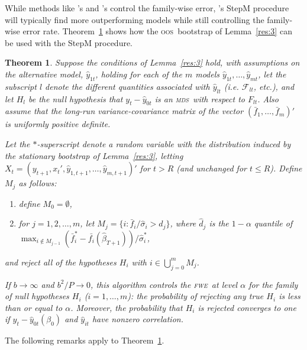\documentclass[12pt]{article}
\newcommand\citepos[2][]{\citeauthor{#2}'s \citeyearpar[#1]{#2}}
\newtheorem{thm}{Theorem}
\theoremstyle{definition}
\newcommand{\mds}{\textsc{mds}}
\newcommand{\oos}{\textsc{oos}}
\newcommand{\fwe}{\textsc{fwe}}
\begin{document}
While methods like \citepos{Whi:00} and \citepos{Han:05} control the
family-wise error, \citepos{RoW:05} StepM procedure will typically find
more outperforming models while still controlling the family-wise error
rate.  Theorem~\ref{res:2} shows how the \oos\ bootstrap of
Lemma~\ref{res:3} can be used with the StepM procedure.  

\begin{thm}\label{res:2}
  Suppose the conditions of Lemma~\ref{res:3} hold, with assumptions
  on the alternative model, $\hat{y}_{1t}$, holding for each of the
  $m$ models $\hat{y}_{1t}, \dots, \hat{y}_{mt}$, let the subscript
  $l$ denote the different quantities associated with $\hat{y}_{lt}$
  (i.e. $\mathcal{F}_{lt}$, etc.), and let $H_l$ be the null
  hypothesis that $y_t - \hat{y}_{0t}$ is an \mds\ with respect to
  $F_{lt}$.  Also assume that the long-run variance-covariance matrix
  of the vector $(\bar{f}_1,\dots,\bar{f}_m)'$ is uniformly positive
  definite.  

  Let the $*$-superscript denote a random variable with the
  distribution induced by the stationary bootstrap of
  Lemma~\ref{res:3}, letting $X_t = (y_{t+1}, x_t', \hat{y}_{1,t+1},
  \dots, \hat{y}_{m, t+1})'$ for $t > R$ (and unchanged for $t \leq
  R$).  Define $M_j$ as follows:
  \begin{enumerate}
  \item define $M_0 = \emptyset$,
  \item for $j = 1,2,\dots,m$, let $M_j = \{i : \bar{f}_{i} /
    \hat{\sigma}_i > \hat{d}_j\}$, where $\hat{d}_j$ is the $1-\alpha$
    quantile of $\max_{i \notin M_{j-1}} (\bar{f}_{i}^{*} -
    \bar{f_i}(\hat{\beta}_{T+1})) / \hat{\sigma}_i^{*}$,
  \end{enumerate}
  and reject all of the hypotheses $H_i$ with $i \in \bigcup_{j=0}^m
  M_j$.

  If $b \to \infty$ and $b^2/P \to 0$, this algorithm controls the
  \fwe\ at level $\alpha$ for the family of null hypotheses $H_i$
  ($i=1,\dots,m$): the probability of rejecting any true $H_i$ is less
  than or equal to $\alpha$.  Moreover, the probability that $H_i$ is
  rejected converges to one if $y_{t} - \hat{y}_{0t}(\beta_0)$ and
  $\hat{y}_{it}$ have nonzero correlation.
\end{thm}

The following remarks apply to Theorem~\ref{res:2}.
\end{document}
